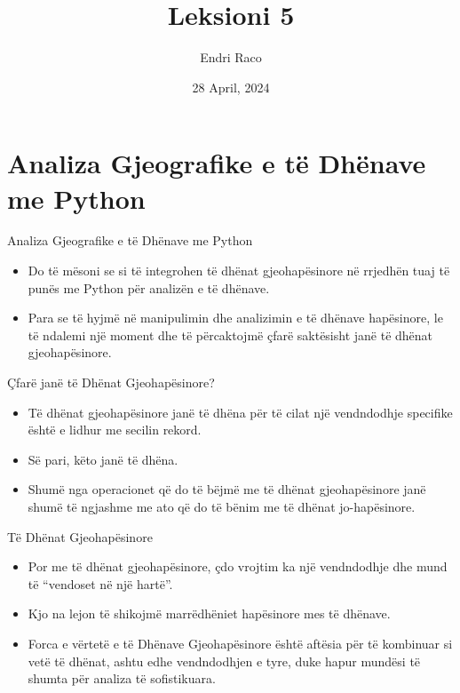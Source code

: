 \documentclass[
  ignorenonframetext,
]{beamer}
\title{Leksioni 5}
\author{Endri Raco}
\date{28 April, 2024}
\begin{document}
\frame{\titlepage}

\begin{frame}[allowframebreaks]
  \tableofcontents[hideallsubsections]
\end{frame}
\hypertarget{analiza-gjeografike-e-tuxeb-dhuxebnave-me-python}{%
\section{Analiza Gjeografike e të Dhënave me
Python}\label{analiza-gjeografike-e-tuxeb-dhuxebnave-me-python}}

\begin{frame}{Analiza Gjeografike e të Dhënave me Python}
\protect\hypertarget{analiza-gjeografike-e-tuxeb-dhuxebnave-me-python-1}{}
\begin{itemize}
\item
  Do të mësoni se si të integrohen të dhënat gjeohapësinore në rrjedhën
  tuaj të punës me Python për analizën e të dhënave.
\item
  Para se të hyjmë në manipulimin dhe analizimin e të dhënave
  hapësinore, le të ndalemi një moment dhe të përcaktojmë çfarë
  saktësisht janë të dhënat gjeohapësinore.
\end{itemize}
\end{frame}

\begin{frame}{Çfarë janë të Dhënat Gjeohapësinore?}
\protect\hypertarget{uxe7faruxeb-januxeb-tuxeb-dhuxebnat-gjeohapuxebsinore}{}
\begin{itemize}
\item
  Të dhënat gjeohapësinore janë të dhëna për të cilat një vendndodhje
  specifike është e lidhur me secilin rekord.
\item
  Së pari, këto janë të dhëna.
\item
  Shumë nga operacionet që do të bëjmë me të dhënat gjeohapësinore janë
  shumë të ngjashme me ato që do të bënim me të dhënat jo-hapësinore.
\end{itemize}
\end{frame}

\begin{frame}{Të Dhënat Gjeohapësinore}
\protect\hypertarget{tuxeb-dhuxebnat-gjeohapuxebsinore}{}
\begin{itemize}
\item
  Por me të dhënat gjeohapësinore, çdo vrojtim ka një vendndodhje dhe
  mund të ``vendoset në një hartë''.
\item
  Kjo na lejon të shikojmë marrëdhëniet hapësinore mes të dhënave.
\item
  Forca e vërtetë e të Dhënave Gjeohapësinore është aftësia për të
  kombinuar si vetë të dhënat, ashtu edhe vendndodhjen e tyre, duke
  hapur mundësi të shumta për analiza të sofistikuara.
\end{itemize}
\end{frame}
\end{document}
